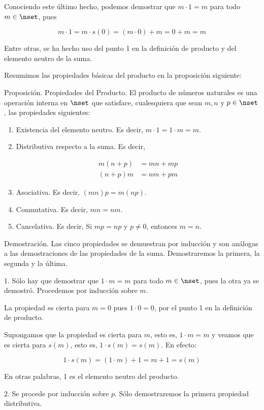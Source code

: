 Conociendo este último hecho, podemos demostrar que $m \cdot 1 = m$ para
todo $m \in \nset$, pues

$$ m \cdot 1 = m \cdot s(0) = (m \cdot 0) + m = 0 + m = m $$

\noindent Entre otras, se ha hecho uso del punto 1 en la definición de
producto y del elemento neutro de la suma.

Resumimos las propiedades básicas del producto en la proposición siguiente:

Proposición. Propiedades del Producto. El producto de números naturales es
una operación interna en $\nset$ que satisface, cualesquiera que sean $m, n$
y $p \in \nset$, las propiedades siguientes:

\begin{enumerate}
  \item Existencia del elemento neutro. Es decir, $m \cdot 1 = 1 \cdot m = m$.
  \item Distributiva respecto a la suma. Es decir,

    \begin{align*}
      m(n + p) &= mn + mp \\
      (n + p)m &= nm + pm
    \end{align*}
  \item Asociativa. Es decir, $(mn)p = m(np)$.
  \item Conmutativa. Es decir, $mn = nm$.
  \item Cancelativa. Es decir, Si $mp = np$ y $p \neq 0$, entonces $m = n$.
\end{enumerate}

Demostración. Las cinco propiedades se demuestran por inducción y son
análogas a las demostraciones de las propiedades de la suma. Demostraremos
la primera, la segunda y la última.

1. Sólo hay que demostrar que $1 \cdot m = m$ para todo $m \in \nset$, pues
la otra ya se demostró. Procedemos por inducción sobre $m$.

La propiedad es cierta para $m = 0$ pues $1 \cdot 0 = 0$, por el punto 1 en
la definición de producto.

Supongamos que la propiedad es cierta para $m$, esto es, $1 \cdot m = m$ y
veamos que es cierta para $s(m)$, esto es, $1 \cdot s(m) = s(m)$. En efecto:

$$ 1 \cdot s(m) = (1 \cdot m) + 1 = m + 1 = s(m) $$

\noindent En otras palabras, 1 es el elemento neutro del producto.

2. Se procede por inducción sobre $p$. Sólo demostraremos la primera
propiedad distributiva.


